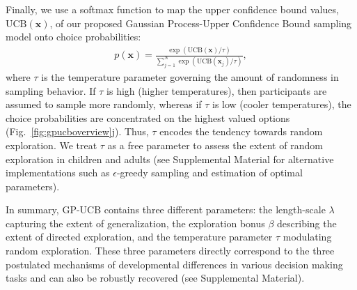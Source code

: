 \documentclass[a4paper,man, floatsintext, natbib]{apa6}
\begin{document}
Finally, we use a softmax function to map the upper confidence bound values, $\text{UCB}(\mathbf{x})$, of our proposed Gaussian Process-Upper Confidence Bound sampling model onto choice probabilities:
\begin{align}
p(\mathbf{x}) = \frac{\exp(\text{UCB}(\mathbf{x})/\tau)}{\sum_{j=1}^{N}\exp(\text{UCB}(\mathbf{x}_j)/\tau)}, 
\end{align}
where $\tau$ is the temperature parameter governing the amount of randomness in sampling behavior. If $\tau$ is high (higher temperatures), then participants are assumed to sample more randomly, whereas if $\tau$ is low (cooler temperatures), the choice probabilities are concentrated on the highest valued options (Fig.~\ref{fig:gpucboverview}j). Thus, $\tau$ encodes the tendency towards random exploration. We treat $\tau$ as a free parameter to assess the extent of random exploration in children and adults (see Supplemental Material for alternative implementations such as $\epsilon$-greedy sampling and estimation of optimal parameters).

In summary, GP-UCB contains three different parameters: the length-scale $\lambda$ capturing the extent of generalization, the exploration bonus $\beta$ describing the extent of directed exploration, and the temperature parameter $\tau$ modulating random exploration. These three parameters directly correspond to the three postulated mechanisms of developmental differences in various decision making tasks and can also be robustly recovered (see Supplemental Material). 
\end{document}
